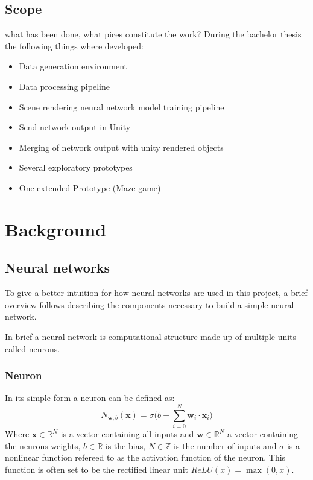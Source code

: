 \documentclass[a4paper, twoside, 10pt]{report}
\begin{document}
\section{Scope}
what has been done, what pices constitute the work?
During the bachelor thesis the following things where developed:

\begin{itemize}
\item{Data generation environment}
\item{Data processing pipeline}
\item{Scene rendering neural network model training pipeline}
\item{Send network output in Unity}
\item{Merging of network output with unity rendered objects}
\item{Several exploratory prototypes}
\item{One extended Prototype (Maze game)}
\end{itemize}



\chapter{Background}
\section{Neural networks}
To give a better intuition for how neural networks are used in this project, a brief overview follows describing the components necessary to build a simple neural network. 

In brief a neural network is computational structure made up of multiple units called neurons.

\subsection{Neuron}
In its simple form a neuron can be defined as:
\begin{equation}
N_{\boldsymbol w, b}(\boldsymbol{x}) = \sigma\Bigg(b + \sum_{i=0}^{N}{\boldsymbol{w}_i \cdot \boldsymbol{x}_i}\Bigg)
\end{equation}
Where $\boldsymbol{x} \in \mathbb{R}^N$ is a vector containing all inputs and  $ \boldsymbol{w} \in \mathbb{R}^N$ a vector containing the neurons weights, $b \in \mathbb{R}$ is the bias, $N \in \mathbb{Z}$ is the number of inputs and $\sigma$ is a nonlinear function refereed to as the activation function of the neuron. This function is often set to be the rectified linear unit $ReLU(x) = \max(0, x)$.
\end{document}
